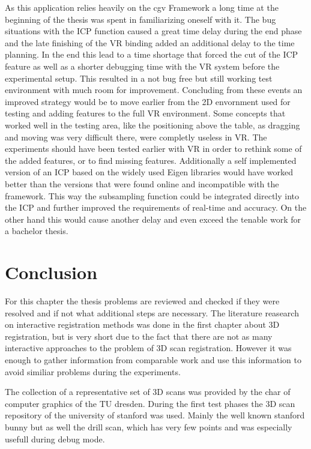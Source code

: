 \documentclass[hyperref,english,bachelorofscience,bibnum]{cgvpub}
\begin{document}
As this application relies heavily on the cgv Framework a long time at the beginning of the thesis was spent in familiarizing oneself with it. The bug situations with the ICP function caused a great time delay during the end phase and the late finishing of the VR binding added an additional delay to the time planning. In the end this lead to a time shortage that forced the cut of the ICP feature as well as a shorter debugging time with the VR system before the experimental setup. This resulted in a not bug free but still working test environment with much room for improvement. Concluding from these events an improved strategy would be to move earlier from the 2D envornment used for testing and adding features to the full VR environment. Some concepts that worked well in the testing area, like the positioning above the table, as dragging and moving was very difficult there, were completly useless in VR. The experiments should have been tested earlier with VR in order to rethink some of the added features, or to find missing features. Additionally a self implemented version of an ICP based on the widely used Eigen libraries would have worked better than the versions that were found online and incompatible with the framework. This way the subsampling function could be integrated directly into the ICP and further improved the requirements of real-time and accuracy. On the other hand this would cause another delay and even exceed the tenable work for a bachelor thesis.


\chapter{Conclusion}

For this chapter the thesis problems are reviewed and checked if they were resolved and if not what additional steps are necessary. 
The literature reasearch on interactive registration methods was done in the first chapter about 3D registration, but is very short due to the fact that there are not as many interactive approaches to the problem of 3D scan registration. However it was enough to gather information from comparable work and use this information to avoid similiar problems during the experiments.

The collection of a representative set of 3D scans was provided by the char of computer graphics of the TU dresden. During the first test phases the 3D scan repository of the university of stanford was used. Mainly the well known stanford bunny but as well the drill scan, which has very few points and was especially usefull during debug mode.
\end{document}
